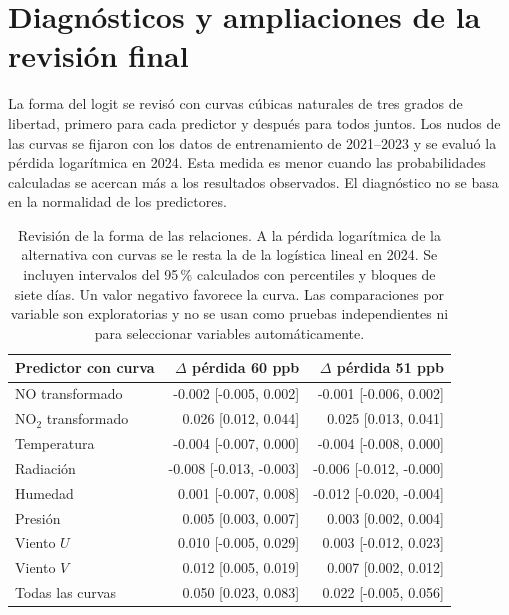 \documentclass[11pt,letterpaper]{article}
\newenvironment{cambio}{}{}
\begin{document}
\begin{cambio}
\section{Diagnósticos y ampliaciones de la revisión final}\label{anexo:retro3}
La forma del logit se revisó con curvas cúbicas naturales de tres grados de libertad, primero para cada predictor y después para todos juntos. Los nudos de las curvas se fijaron con los datos de entrenamiento de 2021--2023 y se evaluó la pérdida logarítmica en 2024. Esta medida es menor cuando las probabilidades calculadas se acercan más a los resultados observados. El diagnóstico no se basa en la normalidad de los predictores.
\end{cambio}
\begin{table}[H]
\begin{cambio}\centering\small
\begin{tabular}{@{}lrr@{}}\toprule
Predictor con curva & $\Delta$ pérdida 60 ppb & $\Delta$ pérdida 51 ppb\\\midrule
NO transformado & -0.002 [-0.005, 0.002] & -0.001 [-0.006, 0.002]\\
NO$_2$ transformado & 0.026 [0.012, 0.044] & 0.025 [0.013, 0.041]\\
Temperatura & -0.004 [-0.007, 0.000] & -0.004 [-0.008, 0.000]\\
Radiación & -0.008 [-0.013, -0.003] & -0.006 [-0.012, -0.000]\\
Humedad & 0.001 [-0.007, 0.008] & -0.012 [-0.020, -0.004]\\
Presión & 0.005 [0.003, 0.007] & 0.003 [0.002, 0.004]\\
Viento $U$ & 0.010 [-0.005, 0.029] & 0.003 [-0.012, 0.023]\\
Viento $V$ & 0.012 [0.005, 0.019] & 0.007 [0.002, 0.012]\\
Todas las curvas & 0.050 [0.023, 0.083] & 0.022 [-0.005, 0.056]\\
\bottomrule\end{tabular}
\caption{Revisión de la forma de las relaciones. A la pérdida logarítmica de la alternativa con curvas se le resta la de la logística lineal en 2024. Se incluyen intervalos del 95\,\% calculados con percentiles y bloques de siete días. Un valor negativo favorece la curva. Las comparaciones por variable son exploratorias y no se usan como pruebas independientes ni para seleccionar variables automáticamente.}\label{tab:diagnostico_logit}
\end{cambio}
\end{table}
\end{document}
